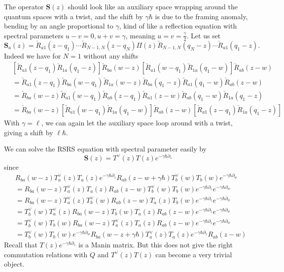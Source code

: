 \documentclass[11pt]{report}
\theoremstyle{definition}
\theoremstyle{remark}
\theoremstyle{remark}
\begin{document}
The operator $\mathbf{S}(z)$ should look like an auxiliary space wrapping around the quantum spaces with a twist, and the shift by $\gamma\hbar$ is due to the framing anomaly, bending by an angle proportional to $\gamma$, kind of like a reflection equation with spectral parameters $u-v=0, u+v=\gamma$, meaning $u=v=\frac{\gamma}{2}$. Let us set
\begin{equation*}
\mathbf{S}_a(z) = \check R_{a1}(z-q_1) \cdots \check R_{N-1,N}(z-q_N) \Pi(z) \check R_{N-1,N}(q_N-z) \cdots \check R_{a1}(q_1-z).
\end{equation*}
Indeed we have for $N=1$ without any shifts
\begin{align*}
&[\check R_{a1}(z-q_1) \check R_{1a}(q_1-z)] \check R_{ba}(w-z) [\check R_{a1}(w-q_1) \check R_{1a}(q_1-w)] \check R_{ab}(z-w) \\
&= \check R_{a1}(z-q_1) \check R_{ba}(w-q_1) \check R_{1a}(w-z) \check R_{ba}(q_1-z) \check R_{a1}(q_1-w) \check R_{ab}(z-w) \\
&= \check R_{ba}(w-z) \check R_{a1}(w-q_1) \check R_{ab}(z-q_1) \check R_{a1}(z-w) \check R_{ab}(q_1-w) \check R_{1a}(q_1-z) \\
&= \check R_{ba}(w-z) [\check R_{a1}(w-q_1) \check R_{1a}(q_1-w)] \check R_{ab}(z-w) [\check R_{a1}(z-q_1) \check R_{1a}(q_1-z)]
\end{align*}
With $\gamma = \ell$, we can again let the auxiliary space loop around with a twist, giving a shift by $\ell\hbar$.

We can solve the RSRS equation with spectral parameter easily by
\begin{equation*}
\mathbf{S}(z) = T^\vee(z) T(z) e^{-\gamma\hbar \partial_z}
\end{equation*}
since
\begin{align*}
&R_{ba}(w-z) T_a^\vee(z) T_a(z) e^{-\gamma\hbar\partial_z} R_{ab}(z-w+\gamma\hbar) T_b^\vee(w) T_b(w) e^{-\gamma\hbar\partial_w} \\
&= R_{ba}(w-z) T_a^\vee(z) T_a(z) R_{ab}(z-w) T_b^\vee(w) T_b(w) e^{-\gamma\hbar\partial_z} e^{-\gamma\hbar\partial_w} \\
&= R_{ba}(w-z) T_a^\vee(z) T_b^\vee(w) R_{ab}(z-w) T_a(z) T_b(w) e^{-\gamma\hbar\partial_z} e^{-\gamma\hbar\partial_w} \\
&= T_b^\vee(w) T_a^\vee(z) R_{ba}(w-z) T_b(w) T_a(z) R_{ab}(z-w) e^{-\gamma\hbar\partial_z} e^{-\gamma\hbar\partial_w} \\
&= T_b^\vee(w) T_b(w) R_{ba}(w-z) T_a^\vee(z) T_a(z) R_{ab}(z-w) e^{-\gamma\hbar\partial_z} e^{-\gamma\hbar\partial_w} \\
&= T_b^\vee(w) T_b(w) e^{-\gamma\hbar\partial_w} R_{ba}(w-z+\gamma\hbar) T_a^\vee(z) T_a(z) e^{-\gamma\hbar\partial_z} R_{ab}(z-w)
\end{align*}
Recall that $T(z) e^{-\gamma\hbar \partial_z}$ is a Manin matrix. But this does not give the right commutation relations with $Q$ and $T^\vee(z) T(z)$ can become a very trivial object.
\end{document}
